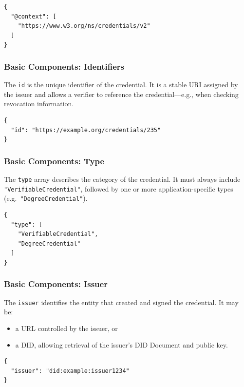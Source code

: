 \begin{verbatim}
{
  "@context": [
    "https://www.w3.org/ns/credentials/v2"
  ]
}
\end{verbatim}

\medskip

\subsubsection*{Basic Components: Identifiers}

The \texttt{id} is the unique identifier of the credential.  
It is a stable URI assigned by the issuer and allows a verifier to reference the
credential—e.g., when checking revocation information.

\begin{verbatim}
{
  "id": "https://example.org/credentials/235"
}
\end{verbatim}

\medskip

\subsubsection*{Basic Components: Type}

The \texttt{type} array describes the category of the credential.  
It must always include \texttt{"VerifiableCredential"}, followed by one or more
application-specific types (e.g.\ \texttt{"DegreeCredential"}).

\begin{verbatim}
{
  "type": [
    "VerifiableCredential",
    "DegreeCredential"
  ]
}
\end{verbatim}

\medskip

\subsubsection*{Basic Components: Issuer}

The \texttt{issuer} identifies the entity that created and signed the credential.  
It may be:
\begin{itemize}
    \item a URL controlled by the issuer, or  
    \item a DID, allowing retrieval of the issuer’s DID Document and public key.
\end{itemize}

\begin{verbatim}
{
  "issuer": "did:example:issuer1234"
}
\end{verbatim}

